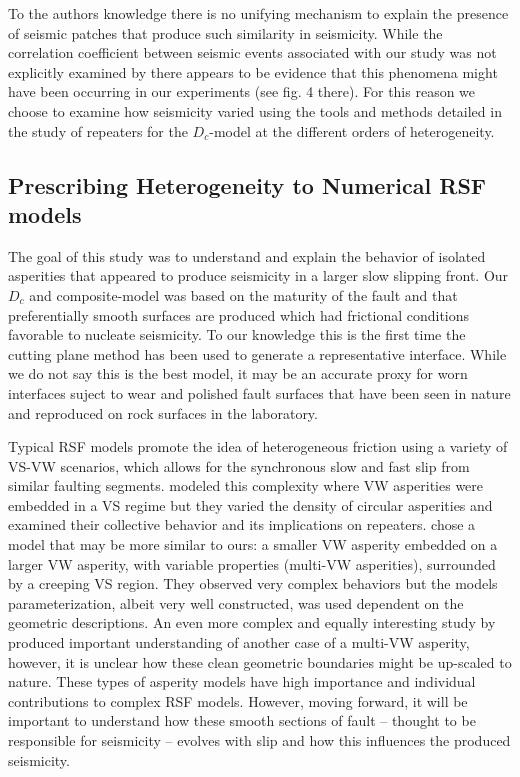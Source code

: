 \documentclass[draft]{agujournal2019}
\begin{document}
To the authors knowledge there is no unifying mechanism to explain the presence of seismic patches that produce such similarity in seismicity.  While the correlation coefficient between seismic events associated with our study was not explicitly examined by  there appears to be evidence that this phenomena might have been occurring in our experiments (see fig. 4 there). For this reason we choose to examine how seismicity varied using the tools and methods detailed in the study of repeaters for the $D_{c}$-model at the different orders of heterogeneity. 

\subsection{Prescribing Heterogeneity to Numerical RSF models}

The goal of this study was to understand and explain the behavior of isolated asperities that appeared to produce seismicity in a larger slow slipping front. Our $D_{c}$ and composite-model was based on the maturity of the fault and that preferentially smooth surfaces are produced which had frictional conditions favorable to nucleate seismicity.  To our knowledge this is the first time the cutting plane method has been used to generate a representative interface.  While we do not say this is the best model, it may be an accurate proxy for worn interfaces suject to wear and polished fault surfaces that have been seen in nature and reproduced on rock surfaces in the laboratory.  

Typical RSF models promote the idea of heterogeneous friction using a variety of VS-VW scenarios, which allows for the synchronous slow and fast slip from similar faulting segments.  modeled this complexity where VW asperities were embedded in a VS regime but they varied the density of circular asperities and examined their collective behavior and its implications on repeaters.  chose a model that may be more similar to ours: a smaller VW asperity embedded on a larger VW asperity, with variable properties (multi-VW asperities), surrounded by a creeping VS region.  They observed very complex behaviors but the models parameterization, albeit very well constructed, was used dependent on the geometric descriptions. An even more complex and equally interesting study by  produced important understanding of another case of a multi-VW asperity, however, it is unclear how these clean geometric boundaries might be up-scaled to nature.  These types of asperity models have high importance and individual contributions to complex RSF models. However, moving forward, it will be important to understand how these smooth sections of fault -- thought to be responsible for seismicity -- evolves with slip and how this influences the produced seismicity. 
\end{document}
